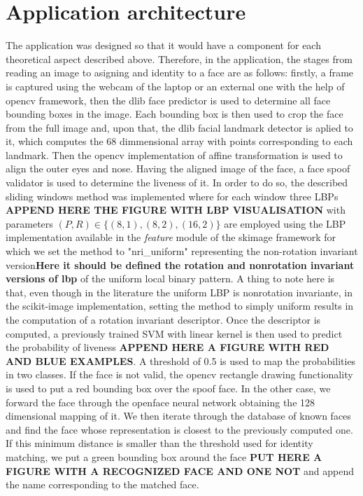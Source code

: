 \section{Application architecture}
The application was designed so that it would have a component for each theoretical aspect described above. Therefore, in the application, the stages from reading an image to asigning and identity to a face are as follows: firstly, a frame is captured using the webcam of the laptop or an external one with the help of opencv framework, then the dlib \cite{dlib09} face predictor is used to determine all face bounding boxes in the image. 
Each bounding box is then used to crop the face from the full image and, upon that, the dlib facial landmark detector is aplied to it, which computes the 68 dimmensional array with points corresponding to each landmark. 
Then the opencv implementation of affine transformation is used to align the outer eyes and nose. Having the aligned image of the face, a face spoof validator is used to determine the liveness of it. 
In order to do so, the described sliding windows method was implemented where for each window three LBPs \textbf{APPEND HERE THE FIGURE WITH LBP VISUALISATION} with parameters $(P,R) \in \{(8,1), (8,2), (16,2)\}$ are employed using the LBP implementation available in the \textit{feature} module of the skimage \cite{scikit-image} framework for which we set the method to "nri\_uniform" representing the non-rotation invariant version\textbf{Here it should be defined the rotation and nonrotation invariant versions of lbp} of the uniform local binary pattern. A thing to note here is that, even though in the literature the uniform LBP is nonrotation invariante, in the scikit-image \cite{scikit-image} implementation, setting the method to simply uniform results in the computation of a rotation invariant descriptor. 
Once the descriptor is computed, a previously trained SVM with linear kernel is then used to predict the probability of liveness \textbf{APPEND HERE A FIGURE WITH RED AND BLUE EXAMPLES}. A threshold of 0.5 is used to map the probabilities in two classes. If the face is not valid, the opencv rectangle drawing functionality is used to put a red bounding box over the spoof face. In the other case, we forward the face through the openface neural network obtaining the 128 dimensional mapping of it. We then iterate through the database of known faces and find the face whose representation is closest to the previously computed one. If this minimum distance is smaller than the threshold used for identity matching, we put a green bounding box around the face \textbf{PUT HERE A FIGURE WITH A RECOGNIZED FACE AND ONE NOT} and append the name corresponding to the matched face. 

